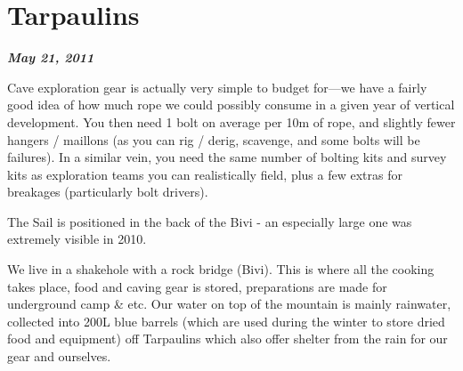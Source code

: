 
\newpage


\section{Tarpaulins}
\textbf{\textit{May 21, 2011}}

Cave exploration gear is actually very simple to budget for—we have
a fairly good idea of how much rope we could possibly consume in a
given year of vertical development. You then need 1 bolt on average
per 10m of rope, and slightly fewer hangers / maillons (as you can rig
/ derig, scavenge, and some bolts will be failures). In a similar
vein, you need the same number of bolting kits and survey kits as
exploration teams you can realistically field, plus a few extras for breakages (particularly bolt drivers).

\begin{pagefigure}
      \checkoddpage \ifoddpage \forcerectofloat \else \forceversofloat \fi
      \centering
  \caption{The Sail is positioned in the back of the Bivi - an especially large one was extremely visible in 2010. } \label{2010 big tarp}
\end{pagefigure}

We live in a shakehole with a rock bridge (Bivi). This is where all
the cooking takes place, food and caving gear is stored, preparations
are made for underground camp \& etc. Our water on top of the mountain
is mainly rainwater, collected into 200L blue barrels (which are used
during the winter to store dried food and equipment) off Tarpaulins
which also offer shelter from the rain for our gear and ourselves.

